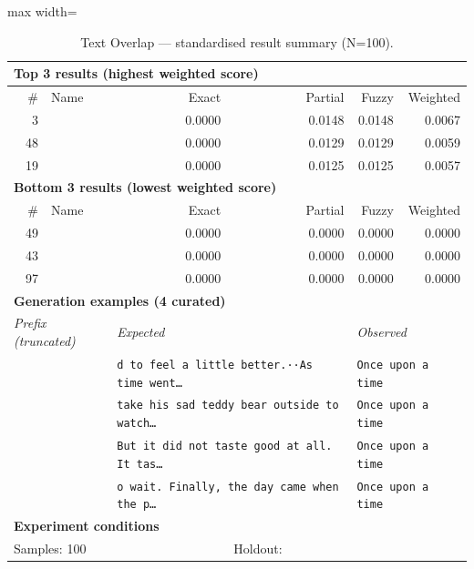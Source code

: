 \begin{table}[htbp]
\centering
\caption{Text Overlap — standardised result summary (N=100).}
\label{tab:text_overlap_summary}
\begin{adjustbox}{max width=\textwidth}
\begin{tabular}{r p{5cm} r r r r}
\toprule
\multicolumn{6}{l}{\textbf{Top 3 results (highest weighted score)}} \\
\midrule
\# & Name & Exact & Partial & Fuzzy & Weighted \\
\midrule
3 &  & 0.0000 & 0.0148 & 0.0148 & 0.0067 \\
48 &  & 0.0000 & 0.0129 & 0.0129 & 0.0059 \\
19 &  & 0.0000 & 0.0125 & 0.0125 & 0.0057 \\
\midrule
\multicolumn{6}{l}{\textbf{Bottom 3 results (lowest weighted score)}} \\
\midrule
\# & Name & Exact & Partial & Fuzzy & Weighted \\
\midrule
49 &  & 0.0000 & 0.0000 & 0.0000 & 0.0000 \\
43 &  & 0.0000 & 0.0000 & 0.0000 & 0.0000 \\
97 &  & 0.0000 & 0.0000 & 0.0000 & 0.0000 \\
\midrule
\multicolumn{6}{l}{\textbf{Generation examples (4 curated)}} \\
\midrule
\multicolumn{2}{l}{\textit{Prefix (truncated)}} & \multicolumn{2}{l}{\textit{Expected}} & \multicolumn{2}{l}{\textit{Observed}} \\
\midrule
\multicolumn{2}{l}{\texttt{}} & \multicolumn{2}{l}{\texttt{d to feel a little better.··As time went\ldots}} & \multicolumn{2}{l}{\texttt{Once upon a time}} \\
\multicolumn{2}{l}{\texttt{}} & \multicolumn{2}{l}{\texttt{take his sad teddy bear outside to watch\ldots}} & \multicolumn{2}{l}{\texttt{Once upon a time}} \\
\multicolumn{2}{l}{\texttt{}} & \multicolumn{2}{l}{\texttt{But it did not taste good at all. It tas\ldots}} & \multicolumn{2}{l}{\texttt{Once upon a time}} \\
\multicolumn{2}{l}{\texttt{}} & \multicolumn{2}{l}{\texttt{o wait. Finally, the day came when the p\ldots}} & \multicolumn{2}{l}{\texttt{Once upon a time}} \\
\midrule
\multicolumn{6}{l}{\textbf{Experiment conditions}} \\
\midrule
\multicolumn{3}{l}{Samples: 100} & \multicolumn{3}{l}{Holdout: } \\

\end{tabular}
\end{adjustbox}
\end{table}
